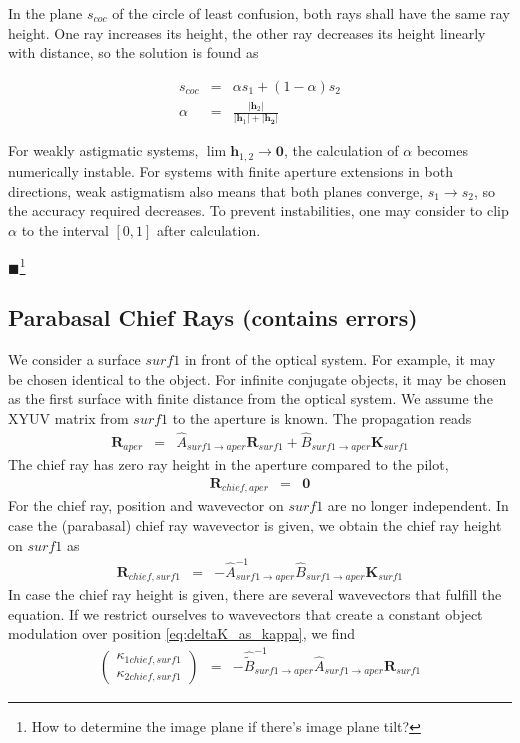\documentclass[12pt,a4paper,twoside,openright,BCOR10mm,headsepline,titlepage,abstracton,chapterprefix,final]{scrreprt}
\newcommand\Vector[1]{{\mathbf{#1}}}
\newcommand{\remark}[1]{{\color{red}$\blacksquare$}\footnote{{\color{red}#1}}}
\begin{document}
In the plane $s_{coc}$ of the circle of least confusion, both rays shall have the same ray height.
One ray increases its height, the other ray decreases its height linearly with distance, so the solution is found as

\begin{eqnarray}
 s_{coc} &=& \alpha s_1 + (1-\alpha) s_2 \\
 \alpha  &=& \frac{|\Vector{h}_2|}{|\Vector{h}_1| + |\Vector{h_2}|}
\end{eqnarray}

For weakly astigmatic systems, $\lim \Vector{h}_{1,2} \rightarrow \Vector{0}$, 
the calculation of $\alpha$ becomes numerically instable.
For systems with finite aperture extensions in both directions, 
weak astigmatism also means that both planes converge, $s_1 \rightarrow s_2$,
so the accuracy required decreases.
To prevent instabilities, one may consider to clip $\alpha$ to the interval $[0,1]$ after calculation.

\remark{How to determine the image plane if there's image plane tilt?}

\subsection{Parabasal Chief Rays (contains errors)}
We consider a surface $surf1$ in front of the optical system.
For example, it may be chosen identical to the object.
For infinite conjugate objects, it may be chosen as the first surface with finite distance from the optical system.
We assume the XYUV matrix from $surf1$ to the aperture is known.
The propagation reads
\begin{eqnarray}
 \Vector{R}_{aper}
  &=&
  \hat{A}_{surf1\rightarrow aper}  
  \Vector{R}_{surf1}
  +
  \hat{B}_{surf1\rightarrow aper}
  \Vector{K}_{surf1}
\end{eqnarray}
The chief ray has zero ray height in the aperture compared to the pilot,
\begin{eqnarray}
 \Vector{R}_{chief, aper} &=& \Vector{0} 
\end{eqnarray}
For the chief ray, position and wavevector on $surf1$ are no longer independent.
In case the (parabasal) chief ray wavevector is given, we obtain the chief ray height on $surf1$ as
\begin{eqnarray}
 \Vector{R}_{chief, surf1}
 &=&
 - \hat{A}^{-1}_{surf1\rightarrow aper} \hat{B}_{surf1\rightarrow aper} \Vector{K}_{surf1}
\end{eqnarray}
In case the chief ray height is given, there are several wavevectors that fulfill the equation.
If we restrict ourselves to wavevectors that create a constant object modulation over position \eqref{eq:deltaK_as_kappa},
we find
\begin{eqnarray}
 \begin{pmatrix} \kappa_{1 chief,surf1} \\ \kappa_{2 chief,surf1} \end{pmatrix}
  &=&
  - \hat{\tilde{B}}^{-1}_{surf1\rightarrow aper} \hat{A}_{surf1\rightarrow aper} \Vector{R}_{surf1} \label{eq:kappachief_as_function_of_R}
\end{eqnarray}
\end{document}
